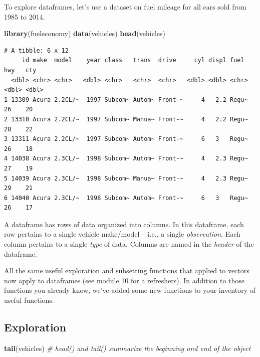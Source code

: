 \documentclass[
]{book}
\newenvironment{Shaded}{\begin{snugshade}}{\end{snugshade}}
\newcommand{\CommentTok}[1]{\textcolor[rgb]{0.56,0.35,0.01}{\textit{#1}}}
\newcommand{\KeywordTok}[1]{\textcolor[rgb]{0.13,0.29,0.53}{\textbf{#1}}}
\newcommand{\NormalTok}[1]{#1}
\begin{document}
To explore dataframes, let's use a dataset on fuel mileage for all cars sold from 1985 to 2014.

\begin{Shaded}
\begin{Highlighting}[]
\KeywordTok{library}\NormalTok{(fueleconomy)}
\KeywordTok{data}\NormalTok{(vehicles)}
\KeywordTok{head}\NormalTok{(vehicles)}
\end{Highlighting}
\end{Shaded}

\begin{verbatim}
# A tibble: 6 x 12
     id make  model    year class   trans  drive     cyl displ fuel    hwy   cty
  <dbl> <chr> <chr>   <dbl> <chr>   <chr>  <chr>   <dbl> <dbl> <chr> <dbl> <dbl>
1 13309 Acura 2.2CL/~  1997 Subcom~ Autom~ Front-~     4   2.2 Regu~    26    20
2 13310 Acura 2.2CL/~  1997 Subcom~ Manua~ Front-~     4   2.2 Regu~    28    22
3 13311 Acura 2.2CL/~  1997 Subcom~ Autom~ Front-~     6   3   Regu~    26    18
4 14038 Acura 2.3CL/~  1998 Subcom~ Autom~ Front-~     4   2.3 Regu~    27    19
5 14039 Acura 2.3CL/~  1998 Subcom~ Manua~ Front-~     4   2.3 Regu~    29    21
6 14040 Acura 2.3CL/~  1998 Subcom~ Autom~ Front-~     6   3   Regu~    26    17
\end{verbatim}

A dataframe has rows of data organized into columns. In this dataframe, each row pertains to a single vehicle make/model -- i.e., a single \emph{observation}. Each column pertains to a single \emph{type} of data. Columns are named in the \emph{header} of the dataframe.

All the same useful exploration and subsetting functions that applied to vectors now apply to dataframes (see module 10 for a refreshers). In addition to those functions you already know, we've added some new functions to your inventory of useful functions.

\hypertarget{exploration}{%
\subsection*{Exploration}\label{exploration}}

\begin{Shaded}
\begin{Highlighting}[]
\KeywordTok{tail}\NormalTok{(vehicles) }\CommentTok{# head() and tail() summarize the beginning and end of the object}
\end{Highlighting}
\end{Shaded}
\end{document}
